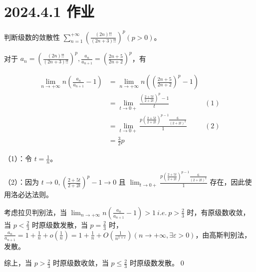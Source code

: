\ifx\allfiles\undefined

\date{}
\author{尹锦润}

\maketitle
\fi

\section{2024.4.1 作业}
\begin{ques}
	判断级数的敛散性 $\displaystyle \sum _{n=1}^{+\infty }\left(\frac{( 2n) !!}{( 2n+3) !!}\right)^{p}( p >0)$。
\end{ques}



对于 $\displaystyle a_{n} =\left(\frac{( 2n) !!}{( 2n+3) !!}\right)^{p} ,\frac{a_{n}}{a_{n+1}} =\left(\frac{2n+5}{2n+2}\right)^{p}$，有


\begin{align*}
	\lim _{n\rightarrow +\infty } n\left(\frac{a_{n}}{a_{n+1}} -1\right) & =\lim _{n\rightarrow +\infty } n\left(\left(\frac{2n+5}{2n+2}\right)^{p} -1\right) & \\
	& =\lim _{t\rightarrow 0+}\frac{\left(\frac{2+5t}{2+2t}\right)^{p} -1}{t} & ( 1)\\
	& =\lim _{t\rightarrow 0+}\frac{p\left(\frac{2+5t}{2+2t}\right)^{p-1}\frac{6}{( 2+2t)^{2}}}{1} & ( 2)\\
	& =\frac{3}{2} p & 
\end{align*}


（1）：令 $\displaystyle t=\frac{1}{n}$。

（2）：因为 $\displaystyle t\rightarrow 0,\left(\frac{2+5t}{2+2t}\right)^{p} -1\rightarrow 0$ 且 $\displaystyle \lim _{t\rightarrow 0+}\frac{p\left(\frac{2+5t}{2+2t}\right)^{p-1}\frac{6}{( 2+2t)^{2}}}{1}$ 存在，因此使用洛必达法则。

考虑拉贝判别法，当 $\displaystyle \lim _{n\rightarrow +\infty } n\left(\frac{a_{n}}{a_{n+1}} -1\right)  >1\ i.e.\ p >\frac{2}{3}$ 时，有原级数收敛，当 $\displaystyle p< \frac{2}{3}$ 时原级数发散，当 $\displaystyle p=\frac{2}{3}$ 时，$\displaystyle \frac{a_{n}}{a_{n+1}} =1+\frac{1}{n} +o\left(\frac{1}{n}\right) =1+\frac{1}{n} +O\left(\frac{1}{n^{1+\varepsilon }}\right)\left( n\rightarrow +\infty ,\exists \varepsilon  >0\right)$，由高斯判别法，发散。

综上，当 $\displaystyle p >\frac{2}{3}$ 时原级数收敛，当 $\displaystyle p\leqslant \frac{2}{3}$ 时原级数发散。\qed 



